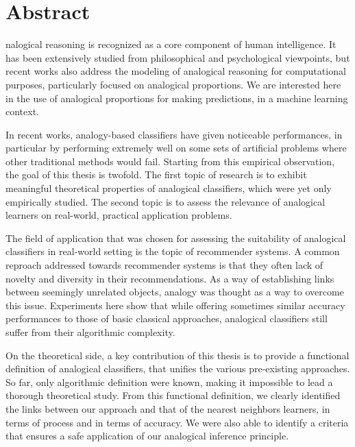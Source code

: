 \chapter*{Abstract}

nalogical reasoning is recognized as a core component of human
intelligence. It has been extensively studied from philosophical and
psychological viewpoints, but recent works also address the modeling of
analogical reasoning for computational purposes, particularly focused on
analogical proportions. We are interested here in the use of analogical
proportions for making predictions, in a machine learning context.

In recent works, analogy-based classifiers have given noticeable performances,
in particular by performing extremely well on some sets of artificial problems
where other traditional methods would fail. Starting from this empirical
observation, the goal of this thesis is twofold. The first topic of research is
to exhibit meaningful theoretical properties of analogical classifiers, which
were yet only empirically studied.  The second topic is to assess the relevance
of analogical learners on real-world, practical application problems.

The field of application that was chosen for assessing the suitability of
analogical classifiers in real-world setting is the topic of recommender
systems. A common reproach addressed towards recommender systems is that they
often lack of novelty and diversity in their recommendations. As a way of
establishing links between seemingly unrelated objects, analogy was thought as
a way to overcome this issue. Experiments here show that while offering
sometimes similar accuracy performances to those of basic classical approaches,
analogical classifiers still suffer from their algorithmic complexity.

On the theoretical side, a key contribution of this thesis is to provide a
functional definition of analogical classifiers, that unifies the various
pre-existing approaches. So far, only algorithmic definition were known, making
it impossible to lead a thorough theoretical study. From this functional
definition, we clearly identified the links between our approach and that of
the nearest neighbors learners, in terms of process and in terms of accuracy.
We were also able to identify a criteria that ensures a safe application of our
analogical inference principle.
